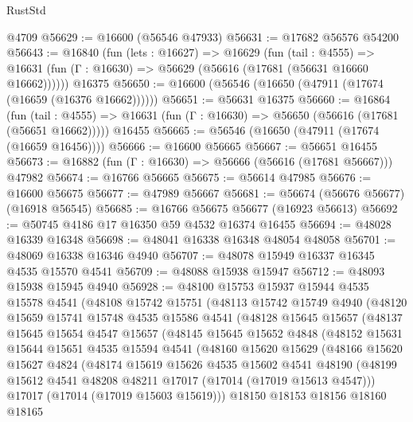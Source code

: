 \begin{lexlean}{RustStd}
\begin{coremodule}
    @4709
@56629 := @16600 (@56546 @47933)
@56631 := @17682 @56576 @54200
@56643 := @16840
    (fun (lets : @16627) =>
    @16629
      (fun (tail : @4555) =>
      @16631 (fun (Γ : @16630) => @56629 (@56616 (@17681 (@56631 @16660 @16662))))))
    @16375
@56650 := @16600 (@56546 (@16650 (@47911 (@17674 (@16659 (@16376 @16662))))))
@56651 := @56631 @16375
@56660 := @16864
    (fun (tail : @4555) => @16631 (fun (Γ : @16630) => @56650 (@56616 (@17681 (@56651 @16662)))))
    @16455
@56665 := @56546 (@16650 (@47911 (@17674 (@16659 @16456))))
@56666 := @16600 @56665
@56667 := @56651 @16455
@56673 := @16882 (fun (Γ : @16630) => @56666 (@56616 (@17681 @56667))) @47982
@56674 := @16766 @56665
@56675 := @56614 @47985
@56676 := @16600 @56675
@56677 := @47989 @56667
@56681 := @56674 (@56676 @56677) (@16918 @56545)
@56685 := @16766 @56675 @56677 (@16923 @56613)
@56692 := @50745 @4186 @17 @16350 @59 @4532 @16374 @16455
@56694 := @48028 @16339 @16348
@56698 := @48041 @16338 @16348 @48054 @48058
@56701 := @48069 @16338 @16346 @4940
@56707 := @48078 @15949 @16337 @16345 @4535 @15570 @4541
@56709 := @48088 @15938 @15947
@56712 := @48093 @15938 @15945 @4940
@56928 := @48100
    @15753
    @15937
    @15944
    @4535
    @15578
    @4541
    (@48108
      @15742
      @15751
      (@48113
        @15742
        @15749
        @4940
        (@48120
          @15659
          @15741
          @15748
          @4535
          @15586
          @4541
          (@48128
            @15645
            @15657
            (@48137
              @15645
              @15654
              @4547
              @15657
              (@48145
                @15645
                @15652
                @4848
                (@48152
                  @15631
                  @15644
                  @15651
                  @4535
                  @15594
                  @4541
                  (@48160
                    @15620
                    @15629
                    (@48166
                      @15620
                      @15627
                      @4824
                      (@48174
                        @15619
                        @15626
                        @4535
                        @15602
                        @4541
                        @48190
                        (@48199 @15612 @4541 @48208 @48211 @17017 (@17014 (@17019 @15613 @4547)))
                        @17017
                        (@17014 (@17019 @15603 @15619)))
                      @18150
                      @18153
                      @18156
                      @18160
                      @18165

\end{coremodule}
\end{lexlean}
